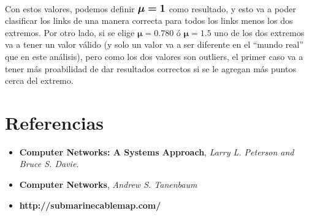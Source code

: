 \documentclass[a4paper,11pt]{article}
\begin{document}
~

Con estos valores, podemos definir $\mathlarger{\mathlarger{\bm{\mu = 1}}}$ como resultado, y esto va a poder clasificar los
links de una manera correcta para todos los links menos los dos extremos. Por otro lado, si se elige
$\bm{\mu} = 0.780$ \'o $\bm{\mu} = 1.5$ uno de los dos extremos va a tener un valor v\'alido (y solo
un valor va a ser diferente en el ``mundo real'' que en este an\'alisis), pero como los dos valores
son outliers, el primer caso va a tener m\'as proabilidad de dar resultados correctos si se le agregan
m\'as puntos cerca del extremo.

\section{Referencias}
\begin{itemize}
	\item \textbf{Computer Networks: A Systems Approach}, \textit{Larry L. Peterson and Bruce S. Davie.}
	\item \textbf{Computer Networks}, \textit{Andrew S. Tanenbaum}
	\item \textbf{http://submarinecablemap.com/}
\end{itemize}
\end{document}
